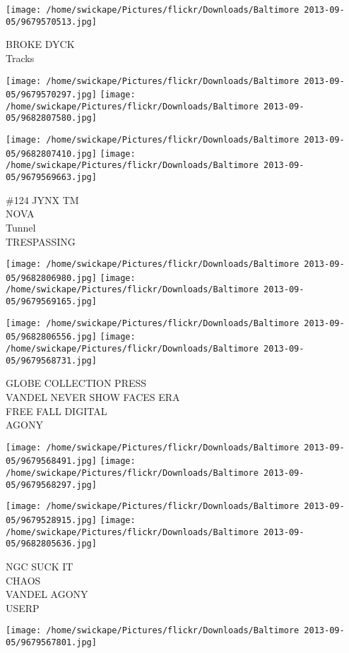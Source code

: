 \documentclass[10pt,letterpaper]{article}
\begin{document}
\vspace{0.25in}
\texttt{[image: /home/swickape/Pictures/flickr/Downloads/Baltimore 2013-09-05/9679570513.jpg]}

BROKE DYCK\\
Tracks
\pagebreak

\texttt{[image: /home/swickape/Pictures/flickr/Downloads/Baltimore 2013-09-05/9679570297.jpg]}
\texttt{[image: /home/swickape/Pictures/flickr/Downloads/Baltimore 2013-09-05/9682807580.jpg]}

\texttt{[image: /home/swickape/Pictures/flickr/Downloads/Baltimore 2013-09-05/9682807410.jpg]}
\texttt{[image: /home/swickape/Pictures/flickr/Downloads/Baltimore 2013-09-05/9679569663.jpg]}

\#124 JYNX TM\\
NOVA\\
Tunnel\\
TRESPASSING
\pagebreak

\texttt{[image: /home/swickape/Pictures/flickr/Downloads/Baltimore 2013-09-05/9682806980.jpg]}
\texttt{[image: /home/swickape/Pictures/flickr/Downloads/Baltimore 2013-09-05/9679569165.jpg]}

\texttt{[image: /home/swickape/Pictures/flickr/Downloads/Baltimore 2013-09-05/9682806556.jpg]}
\texttt{[image: /home/swickape/Pictures/flickr/Downloads/Baltimore 2013-09-05/9679568731.jpg]}

GLOBE COLLECTION PRESS\\
VANDEL NEVER SHOW FACES ERA\\
FREE FALL DIGITAL\\
AGONY
\pagebreak

\texttt{[image: /home/swickape/Pictures/flickr/Downloads/Baltimore 2013-09-05/9679568491.jpg]}
\texttt{[image: /home/swickape/Pictures/flickr/Downloads/Baltimore 2013-09-05/9679568297.jpg]}

\texttt{[image: /home/swickape/Pictures/flickr/Downloads/Baltimore 2013-09-05/9679528915.jpg]}
\texttt{[image: /home/swickape/Pictures/flickr/Downloads/Baltimore 2013-09-05/9682805636.jpg]}

NGC SUCK IT\\
CHAOS\\
VANDEL AGONY\\
USERP
\pagebreak

\texttt{[image: /home/swickape/Pictures/flickr/Downloads/Baltimore 2013-09-05/9679567801.jpg]}
\end{document}
